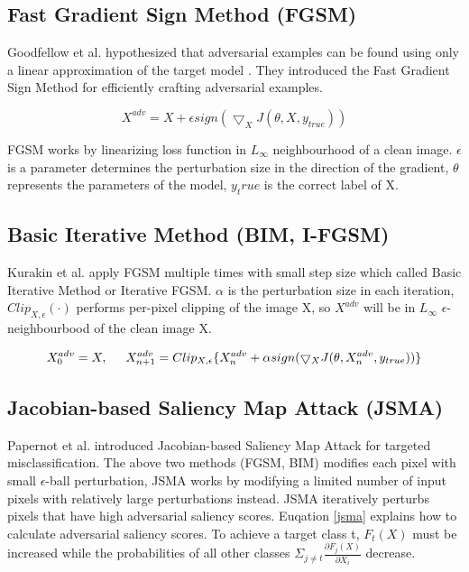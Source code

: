 \documentclass{article}
\begin{document}
\subsection{Fast Gradient Sign Method (FGSM)}

Goodfellow et al. hypothesized that adversarial examples can be found using only a linear approximation of the target model \cite{Goodfellow2014Explaining}. They introduced the Fast Gradient Sign Method for efficiently crafting adversarial examples. 

\begin{equation}
  X^{adv}=X+\epsilon sign(\bigtriangledown_X J(\theta,X,y_{true}))
\end{equation}

FGSM works by linearizing loss function in $L_\infty$ neighbourhood of a clean image. $\epsilon$ is a parameter determines the perturbation size in the direction of the gradient, $\theta$ represents the parameters of the model, $y_true$ is the correct label of X.

\subsection{Basic Iterative Method (BIM, I-FGSM)}

Kurakin et al. apply FGSM multiple times with small step size \cite{Kurakin2016Adversarial} which called Basic Iterative Method or Iterative FGSM. $\alpha$ is the perturbation size in each iteration, $Clip_{X,\epsilon}(\cdot)$ performs per-pixel clipping of the image X, so $X^{adv}$ will be in $L_\infty$ $\epsilon$-neighbourbood of the clean image X.

\begin{equation}
  X_0^{adv}=X, \hspace{0.5cm} X_{n+1}^{adv}=Clip_{X,\epsilon}\{X_n^{adv}+\alpha sign(\bigtriangledown_X J(\theta,X_n^{adv},y_{true}))\}
\end{equation}

\subsection{Jacobian-based Saliency Map Attack (JSMA)}

Papernot et al. \cite{papernot2016the} introduced Jacobian-based Saliency Map Attack for targeted misclassification. The above two methods (FGSM, BIM) modifies each pixel with small $\epsilon$-ball perturbation, JSMA works by modifying a limited number of input pixels with relatively large perturbations instead. JSMA iteratively perturbs pixels that have high adversarial saliency scores. Euqation \ref{jsma} explains how to calculate adversarial saliency scores. To achieve a target class t, $F_t(X)$ must be increased while the probabilities of all other classes $\Sigma_{j\neq t} \frac{\partial F_j(X)}{\partial X_i}$ decrease.
\end{document}
